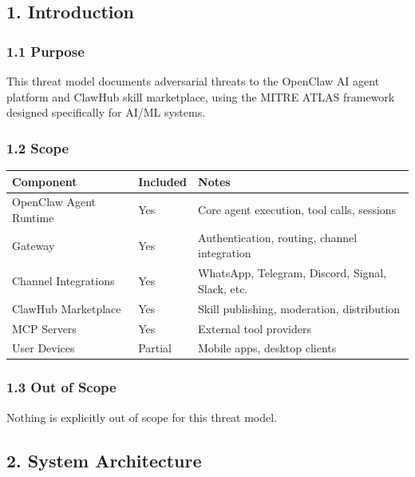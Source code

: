 \hrulefill


\subsection{1. Introduction}


\subsubsection{1.1 Purpose}


This threat model documents adversarial threats to the OpenClaw AI agent platform and ClawHub skill marketplace, using the MITRE ATLAS framework designed specifically for AI/ML systems.

\subsubsection{1.2 Scope}



\begin{table}[h]
\centering
\small
\begin{tabular}{|l|l|l|}
\hline
Component & Included & Notes \\
\hline
OpenClaw Agent Runtime & Yes & Core agent execution, tool calls, sessions \\
\hline
Gateway & Yes & Authentication, routing, channel integration \\
\hline
Channel Integrations & Yes & WhatsApp, Telegram, Discord, Signal, Slack, etc. \\
\hline
ClawHub Marketplace & Yes & Skill publishing, moderation, distribution \\
\hline
MCP Servers & Yes & External tool providers \\
\hline
User Devices & Partial & Mobile apps, desktop clients \\
\hline
\end{tabular}
\end{table}



\subsubsection{1.3 Out of Scope}


Nothing is explicitly out of scope for this threat model.

\hrulefill


\subsection{2. System Architecture}


